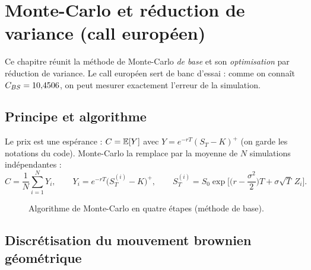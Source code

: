\chapter{Monte-Carlo et réduction de variance (call européen)}

Ce chapitre réunit la méthode de Monte-Carlo \emph{de base} et son \emph{optimisation} par réduction de variance. Le call européen sert de banc d'essai : comme on connaît $C_{BS} = 10{,}4506$, on peut mesurer exactement l'erreur de la simulation.

\section{Principe et algorithme}

Le prix est une espérance : $C = \mathbb{E}[Y]$ avec $Y = e^{-rT}(S_T-K)^+$ (on garde les notations du code). Monte-Carlo la remplace par la moyenne de $N$ simulations indépendantes :
\[
\hat C = \frac1N\sum_{i=1}^N Y_i,\qquad Y_i = e^{-rT}\big(S_T^{(i)}-K\big)^+,\qquad S_T^{(i)} = S_0\exp\Big[\Big(r-\frac{\sigma^2}2\Big)T+\sigma\sqrt T\,Z_i\Big].
\]

\begin{figure}[H]
\centering
{}
\caption{Algorithme de Monte-Carlo en quatre étapes (méthode de base).}
\end{figure}

\section{Discrétisation du mouvement brownien géométrique}\label{sec:discr}

